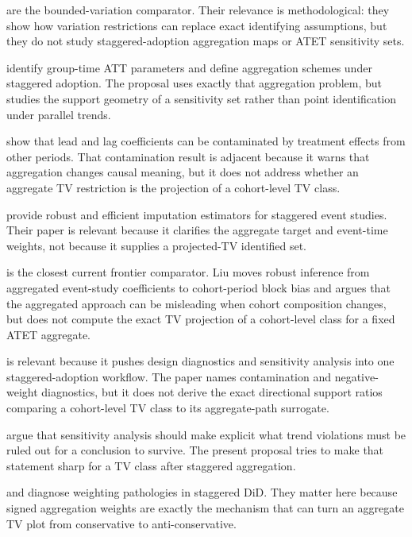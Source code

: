 \documentclass[11pt]{article}
\theoremstyle{definition}
\theoremstyle{plain}
\theoremstyle{remark}
\begin{document}
\citet{ManskiPepper2018BoundedVariation} are the bounded-variation comparator. Their relevance is methodological: they show how variation restrictions can replace exact identifying assumptions, but they do not study staggered-adoption aggregation maps or ATET sensitivity sets.

\citet{CallawaySantAnna2021MultiplePeriods} identify group-time ATT parameters and define aggregation schemes under staggered adoption. The proposal uses exactly that aggregation problem, but studies the support geometry of a sensitivity set rather than point identification under parallel trends.

\citet{SunAbraham2021DynamicEffects} show that lead and lag coefficients can be contaminated by treatment effects from other periods. That contamination result is adjacent because it warns that aggregation changes causal meaning, but it does not address whether an aggregate TV restriction is the projection of a cohort-level TV class.

\citet{BorusyakJaravelSpiess2024EventStudies} provide robust and efficient imputation estimators for staggered event studies. Their paper is relevant because it clarifies the aggregate target and event-time weights, not because it supplies a projected-TV identified set.

\citet{Liu2025CohortAnchored} is the closest current frontier comparator. Liu moves robust inference from aggregated event-study coefficients to cohort-period block bias and argues that the aggregated approach can be misleading when cohort composition changes, but does not compute the exact TV projection of a cohort-level class for a fixed ATET aggregate.

\citet{Wright2026DesignRobust} is relevant because it pushes design diagnostics and sensitivity analysis into one staggered-adoption workflow. The paper names contamination and negative-weight diagnostics, but it does not derive the exact directional support ratios comparing a cohort-level TV class to its aggregate-path surrogate.

\citet{RothSantAnnaBilinskiPoe2023TrendingDiD} argue that sensitivity analysis should make explicit what trend violations must be ruled out for a conclusion to survive. The present proposal tries to make that statement sharp for a TV class after staggered aggregation.

\citet{GoodmanBacon2021Timing} and \citet{deChaisemartinDHaultfoeuille2020TwoWay} diagnose weighting pathologies in staggered DiD. They matter here because signed aggregation weights are exactly the mechanism that can turn an aggregate TV plot from conservative to anti-conservative.
\end{document}
